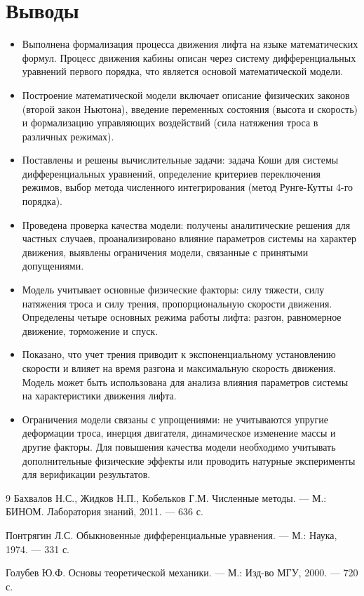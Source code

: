 \documentclass[a4paper, 14pt]{extarticle}
\begin{document}
\section{Выводы}
\begin{itemize}
  \item Выполнена формализация процесса движения лифта на языке математических формул. Процесс движения кабины описан через систему дифференциальных уравнений первого порядка, что является основой математической модели.
  
  \item Построение математической модели включает описание физических законов (второй закон Ньютона), введение переменных состояния (высота и скорость) и формализацию управляющих воздействий (сила натяжения троса в различных режимах).
  
  \item Поставлены и решены вычислительные задачи: задача Коши для системы дифференциальных уравнений, определение критериев переключения режимов, выбор метода численного интегрирования (метод Рунге-Кутты 4-го порядка).
  
  \item Проведена проверка качества модели: получены аналитические решения для частных случаев, проанализировано влияние параметров системы на характер движения, выявлены ограничения модели, связанные с принятыми допущениями.
  
  \item Модель учитывает основные физические факторы: силу тяжести, силу натяжения троса и силу трения, пропорциональную скорости движения. Определены четыре основных режима работы лифта: разгон, равномерное движение, торможение и спуск.
  
  \item Показано, что учет трения приводит к экспоненциальному установлению скорости и влияет на время разгона и максимальную скорость движения. Модель может быть использована для анализа влияния параметров системы на характеристики движения лифта.
  
  \item Ограничения модели связаны с упрощениями: не учитываются упругие деформации троса, инерция двигателя, динамическое изменение массы и другие факторы. Для повышения качества модели необходимо учитывать дополнительные физические эффекты или проводить натурные эксперименты для верификации результатов.
\end{itemize}

\begin{thebibliography}{9}
Бахвалов Н.С., Жидков Н.П., Кобельков Г.М. Численные методы. --- М.: БИНОМ. Лаборатория знаний, 2011. --- 636 с.

Понтрягин Л.С. Обыкновенные дифференциальные уравнения. --- М.: Наука, 1974. --- 331 с.

Голубев Ю.Ф. Основы теоретической механики. --- М.: Изд-во МГУ, 2000. --- 720 с.
\end{thebibliography}
\end{document}

